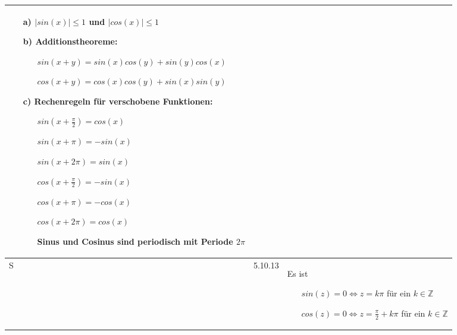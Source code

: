 \begin{longtable}{p{0.75cm} p{1cm} p{16cm}}
\begin{itemize}[topsep=-0.5cm]
                            \item[a)] $|sin(x)| \leq 1$ und $|cos(x)| \leq 1$
                            \item[b)] Additionstheoreme:
                                        \begin{itemize}[topsep=-0.5cm]
                                            \item[] $sin(x+y) = sin(x)cos(y)+sin(y)cos(x)$
                                            \item[] $cos(x+y) = cos(x)cos(y)+sin(x)sin(y)$ 
                                        \end{itemize}
                            \item[c)] Rechenregeln für verschobene Funktionen:
                                        \begin{itemize}[topsep=-0.5cm]
                                            \item[] $sin(x + \frac{\pi}{2}) = cos(x)$
                                            \item[] $sin(x + \pi) = -sin(x)$
                                            \item[] $sin(x+2\pi) = sin(x)$
                                            \item[] $cos(x + \frac{\pi}{2}) = -sin(x)$
                                            \item[] $cos(x+\pi) = -cos(x)$
                                            \item[] $cos(x+2\pi) = cos(x)$
                                            \item[] Sinus und Cosinus sind periodisch mit Periode $2\pi$      
                                        \end{itemize} \vspace{-0cm}
                        \end{itemize} \vspace{-0cm} \\
        \midrule
        S   & 5.10.13&  Es ist
                        \begin{itemize}[topsep=-0.5cm]
                            \item[] $sin(z) = 0 \Leftrightarrow z = k\pi$ für ein $k \in \mathbb{Z}$
                            \item[] $cos(z) = 0 \Leftrightarrow z = \frac{\pi}{2}+k\pi$ für ein $k \in \mathbb{Z}$ 
                        \end{itemize} \vspace{-0cm} \\

\end{longtable}
